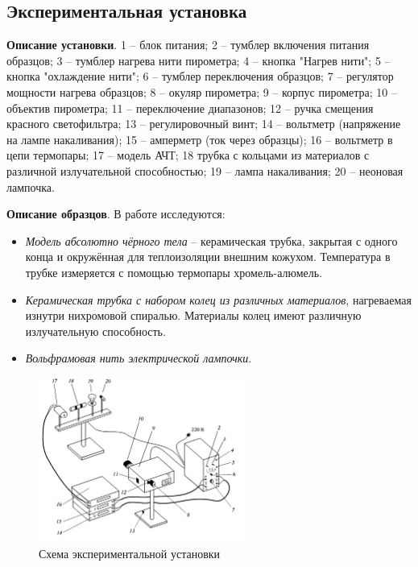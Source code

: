 \subsection*{Экспериментальная установка}

\textbf{Описание установки}. 1 -- блок питания; 2 -- тумблер включения питания образцов; 3 -- тумблер нагрева нити пирометра; 4 -- кнопка "Нагрев нити"; 5 -- кнопка "охлаждение нити"; 6
-- тумблер переключения образцов; 7 -- регулятор мощности нагрева образцов; 8 -- окуляр пирометра; 9 --
корпус пирометра; 10 -- объектив пирометра; 11 -- переключение диапазонов; 12 -- ручка смещения красного
светофильтра; 13 -- регулировочный винт; 14 -- вольтметр (напряжение на лампе накаливания); 15 -- амперметр (ток через образцы); 16 -- вольтметр в цепи термопары; 17 -- модель АЧТ; 18 трубка с кольцами из
материалов с различной излучательной способностью; 19 -- лампа накаливания; 20 -- неоновая лампочка.

\textbf{Описание образцов}. В работе исследуются:
\begin{itemize}
    \item \textit{Модель абсолютно чёрного тела} -- керамическая трубка, закрытая с одного конца и окружённая для теплоизоляции внешним кожухом. Температура в трубке измеряется с помощью термопары хромель-алюмель.
    \item \textit{Керамическая трубка с набором колец из различных материалов}, нагреваемая изнутри нихромовой спиралью. Материалы колец имеют различную излучательную способность.
    \item \textit{Вольфрамовая нить электрической лампочки}.
\end{itemize}

\begin{figure}[h]
    \centering
    \includegraphics[width=0.6\textwidth]{imgs/exp.png}
    \caption{Схема экспериментальной установки}
\end{figure}


